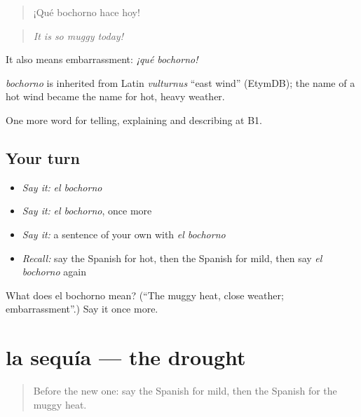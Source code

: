 \begin{quote}
¡Qué bochorno hace hoy!
\end{quote}

\begin{quote}
\emph{It is so muggy today!}
\end{quote}

It also means embarrassment: \emph{¡qué bochorno!}

\begin{cousinweb}
\emph{bochorno} is inherited from Latin \emph{vulturnus} \textquotedblleft{}east wind\textquotedblright{} (EtymDB); the name of a hot wind became the name for hot, heavy weather.
\end{cousinweb}

\begin{grammarlens}[title={What you've built}]
One more word for telling, explaining and describing at B1.
\end{grammarlens}

\subsection*{Your turn}
\begin{itemize}
\raggedright
  \item \emph{Say it:} \emph{el bochorno}
  \item \emph{Say it:} \emph{el bochorno}, once more
  \item \emph{Say it:} a sentence of your own with \emph{el bochorno}
  \item \emph{Recall:} say the Spanish for hot, then the Spanish for mild, then say \emph{el bochorno} again
\end{itemize}

\begin{tcolorbox}[breakable,colback=teal!4,colframe=teal!35!black,title={Before you move on}]
What does el bochorno mean? (\textquotedblleft{}The muggy heat, close weather; embarrassment\textquotedblright{}.) Say it once more.
\end{tcolorbox}
\section[la sequía]{la sequía — the drought}

\label{lesson:ES-C701-sequia}



\begin{quote}
Before the new one: say the Spanish for mild, then the Spanish for the muggy heat.
\end{quote}


